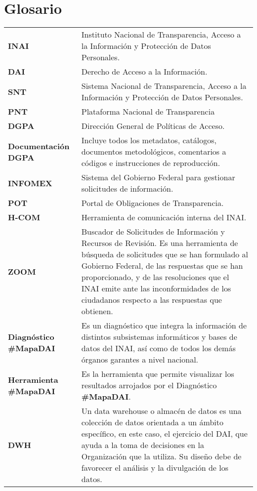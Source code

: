 \documentclass[a4paper, 11pt, oneside]{Thesis}  %
\begin{document}
\chapter{Glosario}
\begin{center}
    \begin{longtable}{p{3cm}p{11.5cm}}
\textbf{INAI} & Instituto Nacional de Transparencia, Acceso a la Información y Protección de Datos Personales. \\
\textbf{DAI} & Derecho de Acceso a la Información. \\
\textbf{SNT} & Sistema Nacional de Transparencia, Acceso a la Información y Protección de Datos Personales. \\
\textbf{PNT} & Plataforma Nacional de Transparencia \\
\textbf{DGPA} & Dirección General de Políticas de Acceso. \\
\textbf{Documentación DGPA} & Incluye todos los metadatos, catálogos, documentos metodológicos, comentarios a códigos e instrucciones de reproducción. \\
\textbf{INFOMEX} & Sistema del Gobierno Federal para gestionar solicitudes de información.\\
\textbf{POT} & Portal de Obligaciones de Transparencia.\\
\textbf{H-COM} & Herramienta de comunicación interna del INAI.\\
\textbf{ZOOM} & Buscador de Solicitudes de Información y Recursos de Revisión. Es una herramienta de búsqueda de solicitudes que se han formulado al Gobierno Federal, de las respuestas que se han proporcionado, y de las resoluciones que el INAI emite ante las inconformidades de los ciudadanos respecto a las respuestas que obtienen. \\
\textbf{Diagnóstico \#MapaDAI} & Es un diagnóstico que integra la información de distintos subsistemas informáticos y bases de datos del INAI, así como de todos los demás órganos garantes a nivel nacional. \\
\textbf{Herramienta \#MapaDAI} & Es la herramienta que permite visualizar los resultados arrojados por el Diagnóstico \textbf{ \#MapaDAI}. \\
\textbf{DWH} & Un data warehouse o almacén de datos es una colección de datos orientada a un ámbito específico, en este caso, el ejercicio del DAI, que ayuda a la toma de decisiones en la Organización que la utiliza. Su diseño debe de favorecer el análisis y la divulgación de los datos. \\

\end{longtable}
\end{center}
\end{document}
